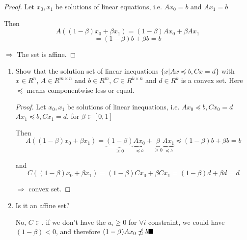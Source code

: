 

\begin{proof}
    Let $x_0, x_1$ be solutions of linear equations, i.e. $A x_0 = b$ and $A x_1 = b$

    Then $$A((1-\beta)x_0 + \beta x_1) = (1-\beta) A x_0 + \beta A x_1$$$$ = (1-\beta)b + \beta b = b$$

    $\Rightarrow$ The set is affine.
\end{proof}




\begin{enumerate}
    \questioncolor
    \item Show that the solution set of linear inequations $\{x | Ax \preceq b, Cx = d\}$ with $x \in R^n$, $A \in R^{m×n}$ and $b \in R^m$, $C \in R^{k×n}$ and $d \in R^k$ is a convex set. Here $\preceq$ means componentwise less or equal. \normalcolor

    \begin{proof}
        Let $x_0, x_1$ be solutions of linear inequations, i.e. $A x_0 \preceq b, C x_0 = d$ \\ $A x_1 \preceq b, C x_1 = d$, for $\beta \in [0, 1]$ \\

        Then $$A((1-\beta)x_0 + \beta x_1) = \underbrace{(1-\beta)}_\text{$\ge 0$} \underbrace{A x_0}_\text{$\preceq b$} + \underbrace{\beta}_\text{$\ge 0$} \underbrace{A x_1}_\text{$\preceq b$} \preceq (1-\beta) b + \beta b = b$$

        and $$C((1-\beta) x_0 + \beta x_1) = (1-\beta) C x_0 + \beta C x_1 = (1-\beta) d + \beta d = d$$

        $\Rightarrow$ convex set.
    \end{proof}



    \questioncolor
    \item Is it an affine set? \normalcolor

    No, $C \in $, if we don't have the $a_i \ge 0$ for $\forall i$ constraint, we could have $(1-\beta) < 0$, and therefore $(1-\beta) A x_0 \npreceq b \hfill \blacksquare$
\end{enumerate}



